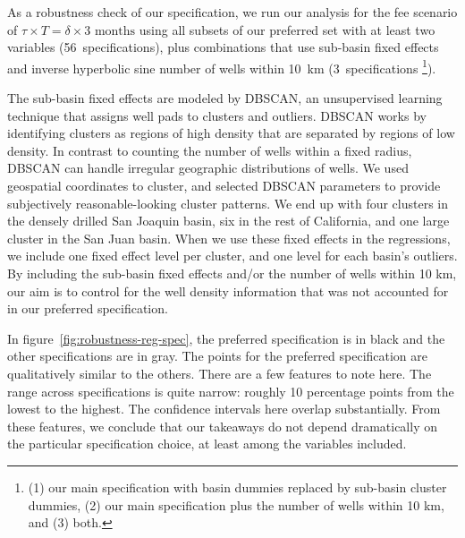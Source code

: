 As a robustness check of our specification, we run our analysis for the fee scenario of \(\tau \times T = \delta \times \text{3 months}\) using all subsets of our preferred set with at least two variables (56~specifications), plus combinations that use sub-basin fixed effects and inverse hyperbolic sine number of wells within 10~km (3~specifications \footnote{(1) our main
specification with basin dummies replaced by sub-basin cluster dummies, (2) our main
specification plus the number of wells within 10 km, and (3) both.}).


The sub-basin fixed effects are modeled by \gls{DBSCAN}, an unsupervised learning technique that assigns well pads to clusters and outliers.
\gls{DBSCAN} works by identifying clusters as regions of high density that are separated by regions of low density.
In contrast to counting the number of wells within a fixed radius, \gls{DBSCAN} can handle irregular geographic distributions of wells.
We used geospatial coordinates to cluster, and selected \gls{DBSCAN} parameters to provide subjectively reasonable-looking cluster patterns.
We end up with four clusters in the densely drilled San Joaquin basin, six in the rest of California, and one large cluster in the San Juan basin.
When we use these fixed effects in the regressions, we include one fixed effect level per cluster, and one level for each basin's outliers.
By including the sub-basin fixed effects and/or the number of wells within 10 km, our aim is to control for the well density information that was not accounted for in our preferred specification.

In figure~\ref{fig:robustness-reg-spec}, the preferred specification is in black and the other specifications are in gray.
The points for the preferred specification are qualitatively similar to the others. There are a few features to note here.
The range across specifications is quite narrow: roughly 10 percentage points from the lowest to the highest.
The confidence intervals here overlap substantially.
From these features, we conclude that our takeaways do not depend dramatically on the particular specification choice, at least among the variables included.



